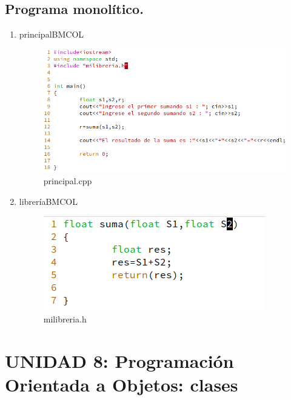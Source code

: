 \documentclass[presentation, aspectratio=54]{beamer}
\begin{document}
\subsection{Programa monolítico.}
\label{sec:org95f615e}
\begin{enumerate}
\item principal\hfill{}\textsc{BMCOL}
\label{sec:org5f4e049}
\begin{figure}[htbp]
\centering
\includegraphics[width=1.3\textwidth]{./images/codigo/principal.png}
principal.cpp
\end{figure}
\item librería\hfill{}\textsc{BMCOL}
\label{sec:org435b222}
\begin{figure}[htbp]
\centering
\includegraphics[width=0.7\linewidth]{./images/codigo/milibreria.png}
milibreria.h
\end{figure}
\end{enumerate}



\section{UNIDAD 8: Programación Orientada a Objetos: clases}
\label{sec:org77467b1}
\end{document}
